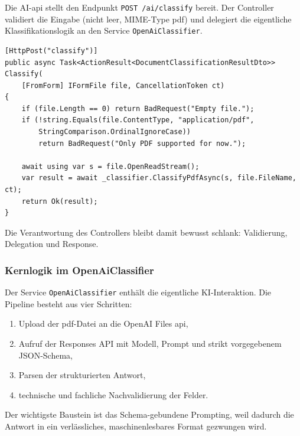 Die AI-\acrshort{api} stellt den Endpunkt \texttt{POST /ai/classify} bereit. Der Controller validiert die Eingabe (nicht leer, MIME-Type \acrshort{pdf}) und delegiert die eigentliche Klassifikationslogik an den Service \texttt{OpenAiClassifier}.

\begin{lstlisting}[language={[Sharp]C},caption={API-Endpunkt der Dokumenten-Klassifikation},label={lst:classification-endpoint}]
[HttpPost("classify")]
public async Task<ActionResult<DocumentClassificationResultDto>> Classify(
    [FromForm] IFormFile file, CancellationToken ct)
{
    if (file.Length == 0) return BadRequest("Empty file.");
    if (!string.Equals(file.ContentType, "application/pdf",
        StringComparison.OrdinalIgnoreCase))
        return BadRequest("Only PDF supported for now.");

    await using var s = file.OpenReadStream();
    var result = await _classifier.ClassifyPdfAsync(s, file.FileName, ct);
    return Ok(result);
}
\end{lstlisting}

Die Verantwortung des Controllers bleibt damit bewusst schlank: Validierung, Delegation und Response.

\subsubsection{Kernlogik im OpenAiClassifier}

Der Service \texttt{OpenAiClassifier} enthält die eigentliche KI-Interaktion. Die Pipeline besteht aus vier Schritten:
\begin{enumerate}
    \item Upload der \acrshort{pdf}-Datei an die OpenAI Files \acrshort{api},
    \item Aufruf der Responses API mit Modell, Prompt und strikt vorgegebenem JSON-Schema,
    \item Parsen der strukturierten Antwort,
    \item technische und fachliche Nachvalidierung der Felder.
\end{enumerate}

Der wichtigste Baustein ist das Schema-gebundene Prompting, weil dadurch die Antwort in ein verlässliches, maschinenlesbares Format gezwungen wird.

